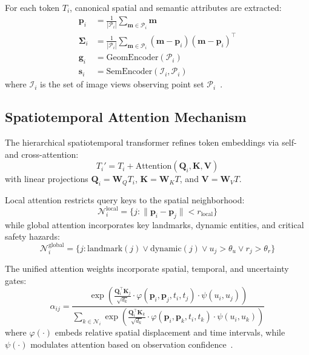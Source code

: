 For each token $T_i$, canonical spatial and semantic attributes are extracted:
\begin{align}
  \mathbf{p}_i &= \frac{1}{|\mathcal{P}_i|} \sum_{\mathbf{m} \in \mathcal{P}_i} \mathbf{m} \\
  \mathbf{\Sigma}_i &= \frac{1}{|\mathcal{P}_i|} \sum_{\mathbf{m} \in \mathcal{P}_i} (\mathbf{m} - \mathbf{p}_i)(\mathbf{m} - \mathbf{p}_i)^\top \\
  \mathbf{g}_i &= \mathrm{GeomEncoder}(\mathcal{P}_i) \\
  \mathbf{s}_i &= \mathrm{SemEncoder}(\mathcal{I}_i, \mathcal{P}_i)
\end{align}
where $\mathcal{I}_i$ is the set of image views observing point set $\mathcal{P}_i$~\cite{li2024hislam, pcpnet2024, he2024efficient}.

\subsection{Spatiotemporal Attention Mechanism}
\label{subsec:attention}

The hierarchical spatiotemporal transformer refines token embeddings via self- and cross-attention:
\begin{equation}
  T_i' = T_i + \mathrm{Attention}(\mathbf{Q}_i, \mathbf{K}, \mathbf{V})
\end{equation}
with linear projections $\mathbf{Q}_i = \mathbf{W}_Q T_i$, $\mathbf{K} = \mathbf{W}_K T$, and $\mathbf{V} = \mathbf{W}_V T$.

Local attention restricts query keys to the spatial neighborhood:
\begin{equation}
  \mathcal{N}_i^{\text{local}} = \{j : \|\mathbf{p}_i - \mathbf{p}_j\| < r_{\text{local}}\}
\end{equation}
while global attention incorporates key landmarks, dynamic entities, and critical safety hazards:
\begin{equation}
  \mathcal{N}_i^{\text{global}} = \{j : \mathrm{landmark}(j) \lor \mathrm{dynamic}(j) \lor u_j > \theta_u \lor r_j > \theta_r\}
\end{equation}

The unified attention weights incorporate spatial, temporal, and uncertainty gates:
\begin{equation}
  \alpha_{ij} = \frac{\exp\left( \frac{\mathbf{Q}_i^\top \mathbf{K}_j}{\sqrt{d_k}} \cdot \varphi(\mathbf{p}_i, \mathbf{p}_j, t_i, t_j) \cdot \psi(u_i, u_j) \right)}{\sum_{k \in \mathcal{N}_i} \exp\left( \frac{\mathbf{Q}_i^\top \mathbf{K}_k}{\sqrt{d_k}} \cdot \varphi(\mathbf{p}_i, \mathbf{p}_k, t_i, t_k) \cdot \psi(u_i, u_k) \right)}
\end{equation}
where $\varphi(\cdot)$ embeds relative spatial displacement and time intervals, while $\psi(\cdot)$ modulates attention based on observation confidence~\cite{yu2025driveoccworld, silva2024s2tpvformer, liao2025i2world, pcpnet2024}.


